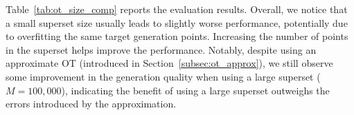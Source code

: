 Table~\ref{tab:ot_size_comp} reports the evaluation results.
%
Overall, we notice that a small superset size usually leads to slightly worse performance, potentially due to overfitting the same target generation points. 
%
Increasing the number of points in the superset helps improve the performance.
%
Notably, despite using an approximate OT (introduced in Section~\ref{subsec:ot_approx}), we still observe some improvement in the generation quality when using a large superset ($M = 100,000$), indicating the benefit of using a large superset outweighs the errors introduced by the approximation.




